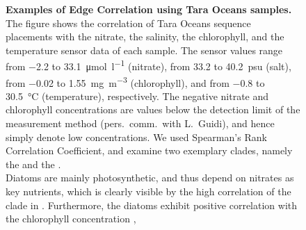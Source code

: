 \begin{figure}[hpbt]
    \centering
    \begin{subfigure}{0pt}
        \label{fig:tara_correlation:sub:nitrate}
    \end{subfigure}
    \begin{subfigure}{0pt}
        \label{fig:tara_correlation:sub:salinity}
    \end{subfigure}
    \begin{subfigure}{0pt}
        \label{fig:tara_correlation:sub:chlorophyll}
    \end{subfigure}
    \begin{subfigure}{0pt}
        \label{fig:tara_correlation:sub:temperature}
    \end{subfigure}
    \caption[Examples of Edge Correlation using Tara Oceans samples]{
        \textbf{Examples of Edge Correlation using Tara Oceans samples.}
        The figure shows the correlation of Tara Oceans sequence placements with
         the nitrate,
         the salinity,
         the chlorophyll, and
         the temperature sensor data of each sample.
        The sensor values range from \SI{-2.2}{} to \SI[per-mode=symbol]{33.1}{\micro\mole\per\litre} (nitrate),
        from \SI{33.2}{} to \SI{40.2}{psu} (salt),
        from \SI{-0.02}{} to \SI[per-mode=symbol]{1.55}{\milli\gram\per\cubic\metre} (chlorophyll), and
        from \SI{-0.8}{} to \SI{30.5}{\celsius} (temperature), respectively.
        The negative nitrate and chlorophyll concentrations are
        values below the detection limit of the measurement method (pers.~comm.~with L.~Guidi),
        and hence simply denote low concentrations.
        We used Spearman's Rank Correlation Coefficient,
        and examine two exemplary clades, namely the  and the .
        \\
        Diatoms are mainly photosynthetic, and thus depend on nitrates as key nutrients,
        which is clearly visible by the high correlation of the clade in .
        Furthermore, the diatoms exhibit positive correlation
        with the chlorophyll concentration ,
}
\end{figure}
